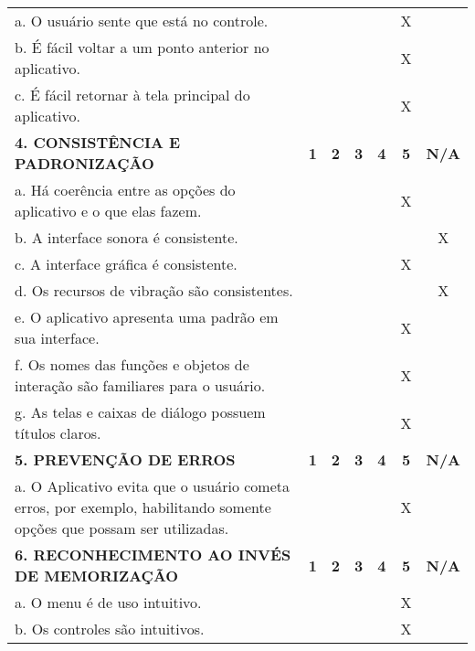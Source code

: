 \documentclass[portuguese,oneside]{tcc}
\begin{document}
\begin{center}
\begin{longtabu}{|L{25em}|c|c|c|c|c|c|}
																																	a. O usuário sente que está no controle. & & & & & X & \\ 
																																	b. É fácil voltar a um ponto anterior no aplicativo. & & & & & X & \\ 
																																	c. É fácil retornar à tela principal do aplicativo. & & & & & X & \\ 
																																	\textbf{4. CONSISTÊNCIA E PADRONIZAÇÃO} & \textbf{1} & \textbf{2} & \textbf{3} & \textbf{4} & \textbf{5} & \textbf{N/A} \\ 
																																	a. Há coerência entre as opções do aplicativo e o que elas fazem. & & & & & X & \\ 
																																	b. A interface sonora é consistente. & & & & & & X \\ 
																																	c. A interface gráfica é consistente. & & & & & X & \\ 
																																	d. Os recursos de vibração são consistentes. & & & & & & X \\ 
																																	e. O aplicativo apresenta uma padrão em sua interface. & & & & & X & \\ 
																																	f. Os nomes das funções e objetos de interação são familiares para o usuário. & & & & & X & \\ 
																																	g. As telas e caixas de diálogo possuem títulos claros. & & & & & X & \\ 
																																	\textbf{5. PREVENÇÃO DE ERROS} & \textbf{1} & \textbf{2} & \textbf{3} & \textbf{4} & \textbf{5} & \textbf{N/A} \\ 
																																	a. O Aplicativo evita que o usuário cometa erros, por exemplo, habilitando somente opções que possam ser utilizadas. & & & & & X & \\ 
																																	\textbf{6. RECONHECIMENTO AO INVÉS DE MEMORIZAÇÃO} & \textbf{1} & \textbf{2} & \textbf{3} & \textbf{4} & \textbf{5} & \textbf{N/A} \\ 
																																	a. O  menu é de uso intuitivo. & & & & & X & \\ 
																																	b. Os controles são intuitivos. & & & & & X & \\ 

\end{longtabu}
\end{center}
\end{document}
